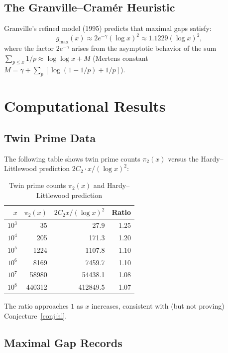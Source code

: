 \documentclass[12pt,a4paper]{amsart}
\theoremstyle{definition}
\begin{document}
\subsection{The Granville--Cram\'{e}r Heuristic}

Granville's refined model (1995) predicts that maximal gaps satisfy:
\[
  g_{\max}(x) \approx 2e^{-\gamma} (\log x)^2 \approx 1.1229 (\log x)^2,
\]
where the factor $2e^{-\gamma}$ arises from the asymptotic behavior of the sum
$\sum_{p \leq x} 1/p \approx \log\log x + M$ (Mertens constant $M =
\gamma + \sum_p [\log(1-1/p) + 1/p]$).

\section{Computational Results}

\subsection{Twin Prime Data}

The following table shows twin prime counts $\pi_2(x)$ versus the Hardy--Littlewood
prediction $2C_2 \cdot x/(\log x)^2$:

\begin{table}[h]
\centering
\caption{Twin prime counts $\pi_2(x)$ and Hardy--Littlewood prediction}
\begin{tabular}{@{}rrrr@{}}
\toprule
$x$ & $\pi_2(x)$ & $2C_2 x/(\log x)^2$ & Ratio \\
\midrule
$10^3$ & 35 & 27.9 & 1.25 \\
$10^4$ & 205 & 171.3 & 1.20 \\
$10^5$ & 1224 & 1107.8 & 1.10 \\
$10^6$ & 8169 & 7459.7 & 1.10 \\
$10^7$ & 58980 & 54438.1 & 1.08 \\
$10^8$ & 440312 & 412849.5 & 1.07 \\
\bottomrule
\end{tabular}
\end{table}

The ratio approaches $1$ as $x$ increases, consistent with (but not proving)
Conjecture~\ref{conj:hl}.

\subsection{Maximal Gap Records}
\end{document}

